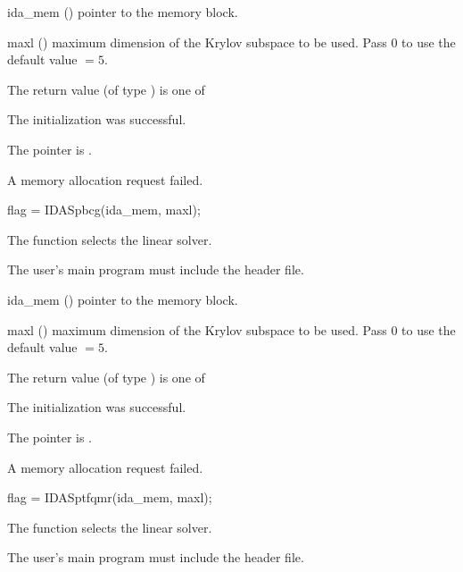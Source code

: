 {
  \begin{args}
  \item[ida\_mem] ()
    pointer to the {\ida} memory block.
  \item[maxl] ()
    maximum dimension of the Krylov subspace to be used. Pass $0$ to use the 
    default value $=5$.
  \end{args}
}
{
  The return value  (of type ) is one of
  \begin{args}
  \item[\Id{IDASPILS\_SUCCESS}] 
    The {\idaspgmr} initialization was successful.
  \item[\Id{IDASPILS\_MEM\_NULL}]
    The  pointer is .
  \item[\Id{IDASPILS\_MEM\_FAIL}]
    A memory allocation request failed.
  \end{args}
}
{}
{
  flag = IDASpbcg(ida\_mem, maxl);
}
{
  The function  selects the {\idaspbcg} linear solver. 

  The user's main program must include the  header file.
}
{
  \begin{args}
  \item[ida\_mem] ()
    pointer to the {\ida} memory block.
  \item[maxl] ()
    maximum dimension of the Krylov subspace to be used. Pass $0$ to use the 
    default value $=5$.
  \end{args}
}
{
  The return value  (of type ) is one of
  \begin{args}
  \item[\Id{IDASPILS\_SUCCESS}] 
    The {\idaspbcg} initialization was successful.
  \item[\Id{IDASPILS\_MEM\_NULL}]
    The  pointer is .
  \item[\Id{IDASPILS\_MEM\_FAIL}]
    A memory allocation request failed.
  \end{args}
}
{}
{
  flag = IDASptfqmr(ida\_mem, maxl);
}
{
  The function  selects the {\idasptfqmr} linear solver. 

  The user's main program must include the  header file.
}
